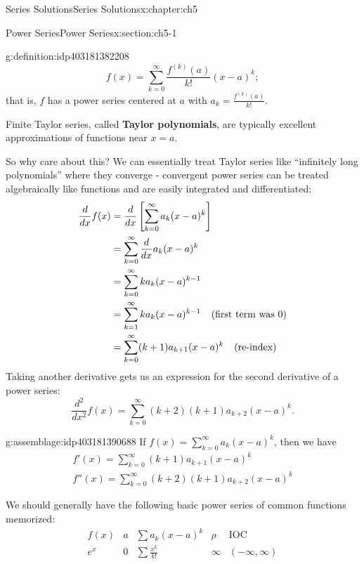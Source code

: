 \documentclass[oneside,10pt,]{book}
\newcommand{\terminology}[1]{\textbf{#1}}
\numberwithin{equation}{section}
\numberwithin{equation}{section}
\newcommand{\amp}{&}
\begin{document}
\begin{chapterptx}{Series Solutions}{}{Series Solutions}{}{}{x:chapter:ch5}
\begin{sectionptx}{Power Series}{}{Power Series}{}{}{x:section:ch5-1}
\begin{definition}{}{g:definition:idp403181382208}
\begin{equation*}
f(x) = \sum_{k=0}^\infty \frac{f^{(k)}(a)}{k!}(x-a)^k;
\end{equation*}
that is, \(f\) has a power series centered at \(a\) with \(a_k = \frac{f^{(k)}(a)}{k!}\).\end{definition}
 Finite Taylor series, called \terminology{Taylor polynomials}, are typically excellent approximations of functions near \(x=a\).%
\par
So why care about this? We can essentially treat Taylor series like ``infinitely long polynomials'' where they converge - convergent power series can be treated algebraically like functions and are easily integrated and differentiated:%
\begin{align*}
\frac{d}{dx} f(x) \amp = \frac{d}{dx} \left[\sum_{k=0}^\infty a_k (x-a)^k\right]\\
\amp= \sum_{k=0}^\infty \frac{d}{dx} a_k (x-a)^k\\
\amp = \sum_{k=0}^\infty k a_k (x-a)^{k-1}\\
\amp = \sum_{k=1}^\infty k a_k (x-a)^{k-1} \hspace{.1in} \text { (first term was 0)}\\
\amp = \sum_{k=0}^\infty (k+1) a_{k+1} (x-a)^k \hspace{.1in} \text{ (re-index)}
\end{align*}
Taking another derivative gets us an expression for the second derivative of a power series:%
\begin{equation*}
\frac{d^2}{dx^2} f(x) = \sum_{k=0}^\infty (k+2)(k+1) a_{k+2} (x-a)^k.
\end{equation*}
%
\begin{assemblage}{}{g:assemblage:idp403181390688}%
If \(f(x) = \sum_{k=0}^\infty a_k (x-a)^k\), then we have%
\begin{gather*}
f'(x) = \sum_{k=0}^\infty (k+1)a_{k+1} (x-a)^k\\
f''(x) = \sum_{k=0}^\infty (k+2)(k+1) a_{k+2} (x-a)^k
\end{gather*}
%
\end{assemblage}
We should generally have the following basic power series of common functions memorized:%
\begin{equation*}
\begin{array}{c|c|c|c|c}
f(x) \amp a \amp \sum a_k (x-a)^k \amp \rho \amp \text{IOC} \\ \hline
e^x \amp 0 \amp \sum \frac{x^k}{k!} \amp \infty \amp (-\infty, \infty) \\

\end{array}
\end{equation*}
\end{sectionptx}
\end{chapterptx}
\end{document}
